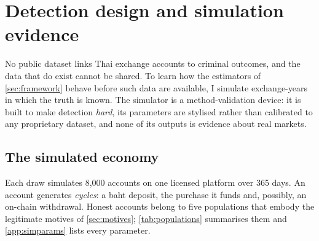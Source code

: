 \section{Detection design and simulation evidence}\label{sec:sim}

No public dataset links Thai exchange accounts to criminal outcomes, and the data that do exist cannot be shared. To
learn how the estimators of \cref{sec:framework} behave before such data are available, I simulate exchange-years in
which the truth is known. The simulator is a method-validation device: it is built to make detection \emph{hard}, its
parameters are stylised rather than calibrated to any proprietary dataset, and none of its outputs is evidence about
real markets.

\subsection{The simulated economy}\label{sec:simdesign}

Each draw simulates 8,000 accounts on one licensed platform over 365 days. An account generates \emph{cycles}: a baht
deposit, the purchase it funds and, possibly, an on-chain withdrawal. Honest accounts belong to five populations that
embody the legitimate motives of \cref{sec:motives}; \cref{tab:populations} summarises them and \cref{app:simparams}
lists every parameter.

